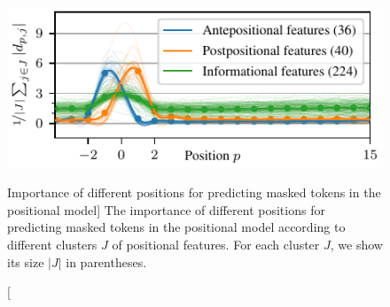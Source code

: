 \begin{figure}
\centering
\includegraphics[width=0.7\columnwidth]{positional-features}
\vspace{-0.2cm}
\caption
  [Importance of different positions for predicting masked tokens in
   the positional model]%
  {The importance of different positions for predicting masked tokens in
   the positional model according to different clusters $J$ of positional
   features. For each cluster $J$, we show its size $|J|$ in parentheses.
   \cite[Figure 4]{novotny2021when}}
\label{fig:position-independent-token-embeddings-interpretability}
\end{figure}
